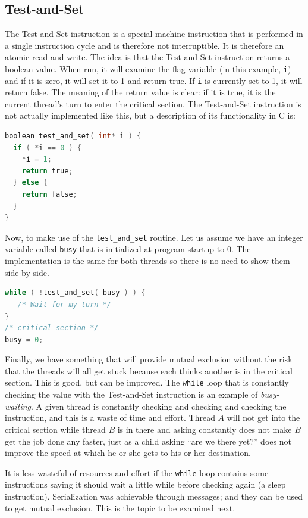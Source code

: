 \documentclass[a4paper]{report}
\begin{document}
\subsection*{Test-and-Set}
The Test-and-Set instruction is a special machine instruction that is performed in a single instruction cycle and is therefore not interruptible. It is therefore an atomic read and write. The idea is that the Test-and-Set instruction returns a boolean value. When run, it will examine the flag variable (in this example, \texttt{i}) and if it is zero, it will set it to 1 and return true. If \texttt{i} is currently set to 1, it will return false. The meaning of the return value is clear: if it is true, it is the current thread's turn to enter the critical section. The Test-and-Set instruction is not actually implemented like this, but a description of its functionality in C is:

\begin{lstlisting}[language=C]
boolean test_and_set( int* i ) {
  if ( *i == 0 ) {
    *i = 1;
    return true;
  } else {
    return false;
  }
}
\end{lstlisting}

Now, to make use of the \texttt{test\_and\_set} routine. Let us assume we have an integer variable called \texttt{busy} that is initialized at program startup to 0. The implementation is the same for both threads so there is no need to show them side by side.

\begin{lstlisting}[language=C]
while ( !test_and_set( busy ) ) {
   /* Wait for my turn */
}
/* critical section */
busy = 0;
\end{lstlisting}

Finally, we have something that will provide mutual exclusion without the risk that the threads will all get stuck because each thinks another is in the critical section. This is good, but can be improved. The \texttt{while} loop that is constantly checking the value with the Test-and-Set instruction is an example of \textit{busy-waiting}. A given thread is constantly checking and checking and checking the instruction, and this is a waste of time and effort. Thread $A$ will not get into the critical section while thread $B$ is in there and asking constantly does not make $B$ get the job done any faster, just as a child asking ``are we there yet?'' does not improve the speed at which he or she gets to his or her destination.

It is less wasteful of resources and effort if the \texttt{while} loop contains some instructions saying it should wait a little while before checking again (a sleep instruction). Serialization was achievable through messages; and they can be used to get mutual exclusion. This is the topic to be examined next.
\end{document}

